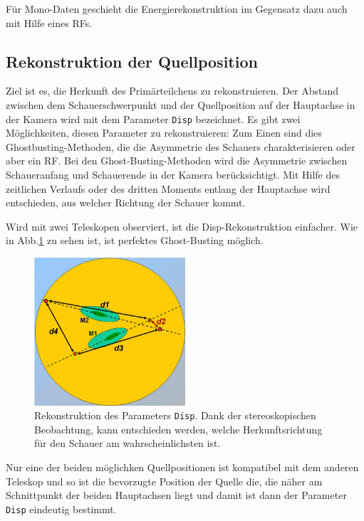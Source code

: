 Für Mono-Daten geschieht die Energierekonstruktion im Gegensatz dazu auch mit Hilfe eines RFs.


\subsection{Rekonstruktion der Quellposition}
Ziel ist es, die Herkunft des Primärteilchens zu rekonstruieren. 
Der Abstand zwischen dem Schauerschwerpunkt und der Quellposition auf der Hauptachse in der Kamera wird mit dem Parameter \texttt{Disp} bezeichnet.
Es gibt zwei Möglichkeiten, diesen Parameter zu rekonstruieren: Zum Einen sind dies Ghostbusting-Methoden, die die Asymmetrie des Schauers charakterisieren oder aber ein RF.
Bei den Ghost-Busting-Methoden wird die Asymmetrie zwischen Schaueranfang und Schauerende in der Kamera berücksichtigt.
Mit Hilfe des zeitlichen Verlaufs oder des dritten Moments entlang der Hauptachse wird entschieden, aus welcher Richtung der Schauer kommt.

Wird mit zwei Teleskopen observiert, ist die Disp-Rekonstruktion einfacher.
Wie in Abb.\ref{Disp} zu sehen ist, ist perfektes Ghost-Busting möglich.

\begin{figure}
    \centering
    \includegraphics[width=0.5\textwidth]{./Plots/04_MrkAnalyse/Disp.png}
    \caption{Rekonstruktion des Parameters \texttt{Disp}. Dank der stereoskopischen Beobachtung, kann entschieden werden, welche Herkunftsrichtung für den Schauer am wahrscheinlichsten ist.\cite{DispRekonstruktion}}
    \label{Disp}
\end{figure}

Nur eine der beiden möglichken Quellpositionen ist kompatibel mit dem anderen Teleskop und so ist die bevorzugte Position der Quelle die, die näher am Schnittpunkt der beiden Hauptachsen liegt und damit ist dann der Parameter \texttt{Disp} eindeutig bestimmt.



